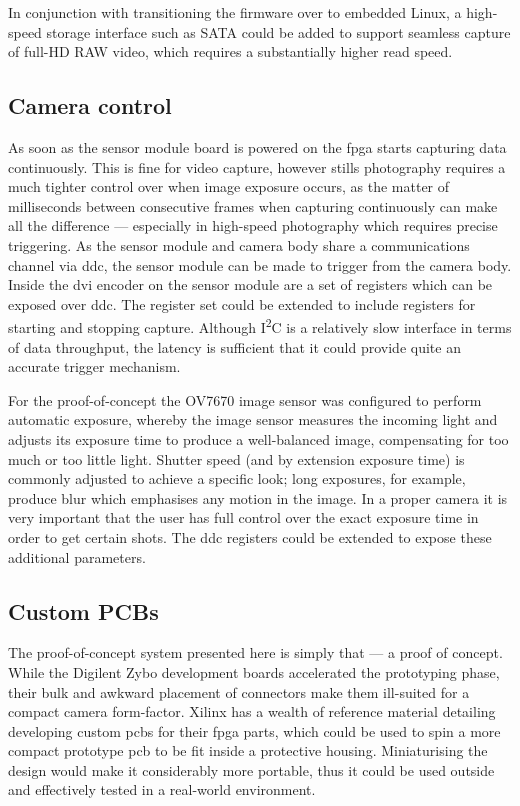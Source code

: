 In conjunction with transitioning the firmware over to embedded Linux, a high-speed storage interface such as SATA could be added to support seamless capture of full-HD RAW video, which requires a substantially higher read speed. 

\subsection{Camera control}

As soon as the sensor module board is powered on the \gls{fpga} starts capturing data continuously. This is fine for video capture, however stills photography requires a much tighter control over when image exposure occurs, as the matter of milliseconds between consecutive frames when capturing continuously can make all the difference --- especially in high-speed photography which requires precise triggering. As the sensor module and camera body share a communications channel via \gls{ddc}, the sensor module can be made to trigger from the camera body. Inside the \gls{dvi} encoder on the sensor module are a set of registers which can be exposed over \gls{ddc}. The register set could be extended to include registers for starting and stopping capture. Although I\textsuperscript{2}C is a relatively slow interface in terms of data throughput, the latency is sufficient that it could provide quite an accurate trigger mechanism.

For the proof-of-concept the OV7670 image sensor was configured to perform automatic exposure, whereby the image sensor measures the incoming light and adjusts its exposure time to produce a well-balanced image, compensating for too much or too little light. Shutter speed (and by extension exposure time) is commonly adjusted to achieve a specific look; long exposures, for example, produce blur which emphasises any motion in the image. In a proper camera it is very important that the user has full control over the exact exposure time in order to get certain shots. The \gls{ddc} registers could be extended to expose these additional parameters.

\subsection{Custom PCBs}

The proof-of-concept system presented here is simply that --- a proof of concept. While the Digilent Zybo development boards accelerated the prototyping phase, their bulk and awkward placement of connectors make them ill-suited for a compact camera form-factor. Xilinx has a wealth of reference material detailing developing custom \glspl{pcb} for their \gls{fpga} parts, which could be used to spin a more compact prototype \gls{pcb} to be fit inside a protective housing. Miniaturising the design would make it considerably more portable, thus it could be used outside and effectively tested in a real-world environment.

